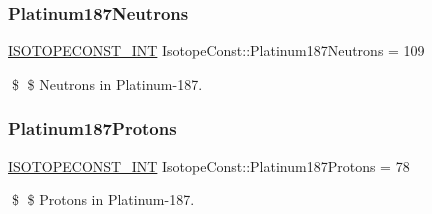 \subsubsection{\texorpdfstring{Platinum187\+Neutrons}{Platinum187Neutrons}}
{\footnotesize\ttfamily \mbox{\hyperlink{group___isotope_const-_macros_ga5f18360b3e99483a35c32d789e62621c}{I\+S\+O\+T\+O\+P\+E\+C\+O\+N\+S\+T\+\_\+\+I\+NT}} Isotope\+Const\+::\+Platinum187\+Neutrons = 109}

\$ \$ Neutrons in Platinum-\/187. \mbox{\label{group___isotope_const-_platinum-_pt187_ga2d1e504c10d4b204ec63bf94f319d13c}} 
\subsubsection{\texorpdfstring{Platinum187\+Protons}{Platinum187Protons}}
{\footnotesize\ttfamily \mbox{\hyperlink{group___isotope_const-_macros_ga5f18360b3e99483a35c32d789e62621c}{I\+S\+O\+T\+O\+P\+E\+C\+O\+N\+S\+T\+\_\+\+I\+NT}} Isotope\+Const\+::\+Platinum187\+Protons = 78}

\$ \$ Protons in Platinum-\/187. 